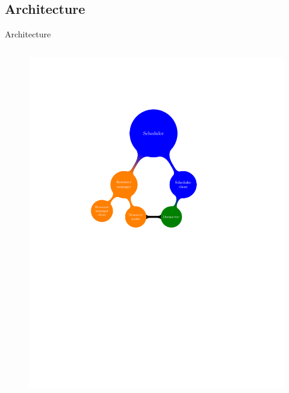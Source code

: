 \documentclass{beamer}
\begin{document}
\subsection{Architecture}
\begin{frame}
	\tableofcontents[currentsubsection]
\end{frame}
\begin{frame}{Architecture}
	\begin{columns}
	\begin{column}[l]{0.5\linewidth}
        \begin{figure}
            \centering
            \includegraphics[trim=5.5cm 14.3cm 2cm 6.3cm,scale=0.69]{netmap_abs.pdf}
        \end{figure}
	\end{column}

\end{columns}
\end{frame}
\end{document}
